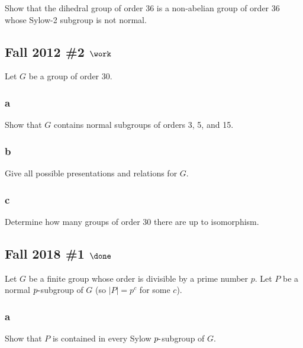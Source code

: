 Show that the dihedral group of order 36 is a non-abelian group of order
36 whose Sylow-2 subgroup is not normal.

\hypertarget{fall-2012-2-work}{%
\subsection{\texorpdfstring{Fall 2012 \#2
\(\work\)}{Fall 2012 \#2 \textbackslash work}}\label{fall-2012-2-work}}

Let \(G\) be a group of order 30.

\hypertarget{a-9}{%
\subsubsection{a}\label{a-9}}

Show that \(G\) contains normal subgroups of orders 3, 5, and 15.

\hypertarget{b-9}{%
\subsubsection{b}\label{b-9}}

Give all possible presentations and relations for \(G\).

\hypertarget{c-7}{%
\subsubsection{c}\label{c-7}}

Determine how many groups of order 30 there are up to isomorphism.

\hypertarget{fall-2018-1-done}{%
\subsection{\texorpdfstring{Fall 2018 \#1
\(\done\)}{Fall 2018 \#1 \textbackslash done}}\label{fall-2018-1-done}}

Let \(G\) be a finite group whose order is divisible by a prime number
\(p\). Let \(P\) be a normal \(p{\hbox{-}}\)subgroup of \(G\) (so
\({\left\lvert {P} \right\rvert} = p^c\) for some \(c\)).

\hypertarget{a-10}{%
\subsubsection{a}\label{a-10}}

Show that \(P\) is contained in every Sylow \(p{\hbox{-}}\)subgroup of
\(G\).

